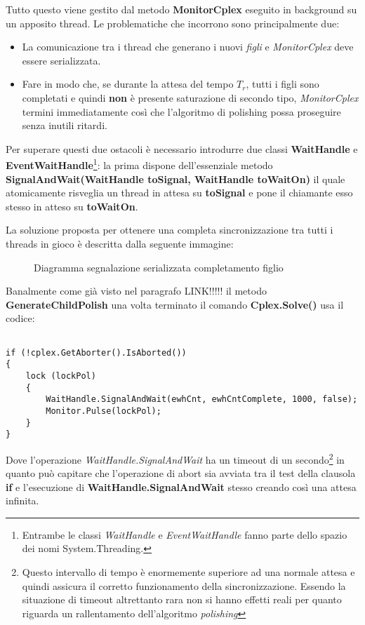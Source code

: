\documentclass[11pt]{article}
\begin{document}
Tutto questo viene gestito dal metodo \textbf{MonitorCplex} eseguito in background su un apposito thread. Le problematiche che incorrono sono principalmente due:
\begin{itemize}
    \item La comunicazione tra i thread che generano i nuovi \textit{figli} e \textit{MonitorCplex} deve essere serializzata.
    \item Fare in modo che, se durante la attesa del tempo $T_r$, tutti i figli sono completati e quindi \textbf{non} è presente saturazione di secondo tipo, \textit{MonitorCplex} termini immediatamente così che l'algoritmo di polishing possa proseguire senza inutili ritardi.
\end{itemize}

Per superare questi due ostacoli è necessario introdurre due classi \textbf{WaitHandle} e \textbf{EventWaitHandle}\footnote{Entrambe le classi \textit{WaitHandle} e \textit{EventWaitHandle} fanno parte dello spazio dei nomi System.Threading.}: la prima dispone dell'essenziale metodo \textbf{SignalAndWait(WaitHandle toSignal, WaitHandle toWaitOn)} il quale atomicamente risveglia un thread in attesa su \textbf{toSignal} e pone il chiamante esso stesso in atteso su \textbf{toWaitOn}.

La soluzione proposta per ottenere una completa sincronizzazione tra tutti i threads in gioco è descritta dalla seguente immagine:

\FloatBarrier

\begin{figure}[htbp]
    \centering
    \caption{Diagramma segnalazione serializzata completamento figlio}
\end{figure}

\FloatBarrier

Banalmente come già visto nel paragrafo LINK!!!!! il metodo \textbf{GenerateChildPolish} una volta terminato il comando \textbf{Cplex.Solve()} usa il codice:

\begin{lstlisting}

if (!cplex.GetAborter().IsAborted())
{
    lock (lockPol)
    {
        WaitHandle.SignalAndWait(ewhCnt, ewhCntComplete, 1000, false);
        Monitor.Pulse(lockPol);
    }
}

\end{lstlisting}

Dove l'operazione \textit{WaitHandle.SignalAndWait} ha un timeout di un secondo\footnote{Questo intervallo di tempo è enormemente superiore ad una normale attesa e quindi assicura il corretto funzionamento della sincronizzazione. Essendo la situazione di timeout altrettanto rara non si hanno effetti reali per quanto riguarda un rallentamento dell'algoritmo \textit{polishing}} in quanto può capitare che l'operazione di abort sia avviata tra il test della clausola \textbf{if} e l'esecuzione di \textbf{WaitHandle.SignalAndWait} stesso creando così una attesa infinita.
\end{document}
